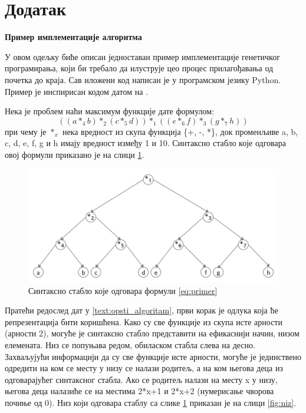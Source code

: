 \documentclass[a4paper]{article}
\begin{document}
\appendix
 


\appendix
\section{Додатак}

\bigskip
\noindent
\textbf{\large Пример имплементације алгоритма}\newline
\label{implementacija}

У овом одељку биће описан једноставан пример имплементације генетичког програмирања, који би требало да илуструје цео процес прилагођавања од почетка до краја. Сав иложени код написан је у програмском језику Python. Пример је инспирисан кодом датом на \cite{ri}. \newline

Нека је проблем наћи максимум функције дате формулом:
\begin{equation} 
    \label{eq:primer}
    ((a *_4 b) *_2 (c *_5 d)) *_1 ((e *_6 f) *_3 (g *_7 h))
\end{equation}
при чему је $*_x$ нека вредност из скупа функција \{+, -, *\}, док променљиве a, b, c, d, e, f, g и h имају вредност између 1 и 10. Синтаксно стабло које одговара овој формули приказано је на слици \ref{fig:stablo}. \newline

\begin{figure}[ht!]
    \begin{center}
        \includegraphics[scale=0.14]{stablo_primera.png}
    \end{center}
    \caption{Синтаксно стабло које одговара формули \eqref{eq:primer}}
    \label{fig:stablo}
\end{figure}

Пратећи редослед дат у \ref{text:opsti_algoritam}, први корак је одлука која ће репрезентација бити коришћена. Како су све функције из скупа исте арности (арности 2), могуће је синтаксно стабло представити на ефикаснији начин, низом елемената. Низ се попуњава редом,  обиласком стабла слева на десно. Захваљујући информацији да су све функције исте арности, могуће је јединствено одредити на ком се месту у низу се налази родитељ, а на ком његова деца из одговарајућег синтаксног стабла. Ако се родитељ налази на месту x у низу, његова деца налазиће се на местима 2*x+1 и 2*x+2 (нумерисање чворова почиње од 0). Низ који одговара стаблу са слике \ref{fig:stablo} приказан је на слици \ref{fig:niz}. \newline
\end{document}
